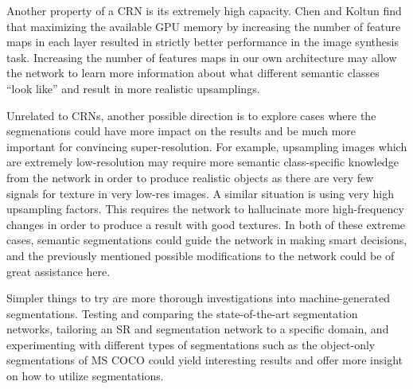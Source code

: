 \documentclass[10pt,twocolumn,letterpaper]{article}
\begin{document}
Another property of a CRN is its extremely high capacity. Chen and Koltun find
that maximizing the available GPU memory by increasing the number of feature
maps in each layer resulted in strictly better performance in the image
synthesis task.  Increasing the number of features maps in our own architecture
may allow the network to learn more information about what different semantic
classes ``look like'' and result in more realistic upsamplings.

Unrelated to CRNs, another possible direction is to explore cases where the
segmenations could have more impact on the results and be much more important
for convincing super-resolution. For example, upsampling images which are
extremely low-resolution may require more semantic class-specific knowledge
from the network in order to produce realistic objects as there are very few
signals for texture in very low-res images. A similar situation is using very
high upsampling factors. This requires the network to hallucinate more
high-frequency changes in order to produce a result with good textures. In both
of these extreme cases, semantic segmentations could guide the network in
making smart decisions, and the previously mentioned possible modifications to
the network could be of great assistance here.

Simpler things to try are more thorough investigations into machine-generated
segmentations. Testing and comparing the state-of-the-art segmentation
networks, tailoring an SR and segmentation network to a specific domain, and
experimenting with different types of segmentations such as the object-only
segmentations of MS COCO \cite{MSCOCO} could yield interesting results and
offer more insight on how to utilize segmentations.

{\small


}
\end{document}
